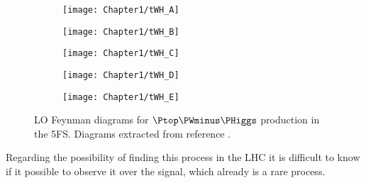 \begin{comment}
\begin{figure}
\centering
\begin{subfigure}{.4\textwidth}
  \centering
  \texttt{[image: Chapter1/tW\_A]}
  \caption{}
  \label{fig:Chap1:tH:tWH:A}
\end{subfigure}%
\begin{subfigure}{.4\textwidth}
  \centering
  \texttt{[image: Chapter1/tW\_B]}
  \caption{}
  \label{fig:Chap1:tH:tWH:B}
\end{subfigure}%
\caption{LO Feynman diagrams for \tW production in the 5FS.}
\label{fig:Chap1:tH:tW}
\end{figure}
\end{comment}

\begin{figure}
\centering
\begin{subfigure}{.37\textwidth}
  \centering
  \texttt{[image: Chapter1/tWH\_A]}
  \caption{}
  \label{fig:Chap1:tH:tWH:A}
\end{subfigure}%
\begin{subfigure}{.27\textwidth}
  \centering
  \texttt{[image: Chapter1/tWH\_B]}
  \caption{}
  \label{fig:Chap1:tH:tWH:B}
\end{subfigure}%
\begin{subfigure}{.27\textwidth}
  \centering
  \texttt{[image: Chapter1/tWH\_C]}
  \caption{}
  \label{fig:Chap1:tH:tWH:C}
\end{subfigure} %
\begin{subfigure}{.36\textwidth}
  \centering
  \texttt{[image: Chapter1/tWH\_D]}
  \caption{}
  \label{fig:Chap1:tH:tWH:D}
\end{subfigure}%
\begin{subfigure}{.27\textwidth}
  \centering
  \texttt{[image: Chapter1/tWH\_E]}
  \caption{}
  \label{fig:Chap1:tH:tWH:E}
\end{subfigure}%

\caption{LO Feynman diagrams for $\Ptop\PWminus\PHiggs$ production in the 5FS. 
Diagrams extracted from reference \cite{Demartin:2016axk}.}
\label{fig:Chap1:tH:tW}
\end{figure}


Regarding the possibility of finding this process in the LHC it is difficult to know if it possible to
observe it over the \ttH signal, which already is a rare process. 

